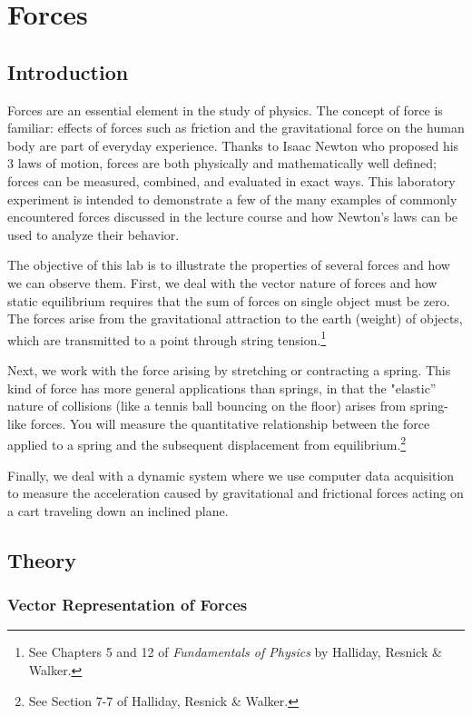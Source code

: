 \chapter{Forces}
\label{chap:forces}
\section{Introduction}

Forces are an essential element in the study of physics. The concept of force is familiar: effects of forces such as friction and the gravitational force on the human body are part of everyday experience. Thanks to Isaac Newton who proposed his 3 laws of motion, forces are both physically and mathematically well defined; forces can be measured, combined, and evaluated in exact ways. This laboratory experiment  is intended to demonstrate a few of the many examples of commonly encountered forces discussed in the lecture course and how Newton's laws can be used to analyze their behavior. \myskip

The objective of this lab is to  illustrate the properties of several forces and how we can observe them. First, we deal with the vector nature of forces and how static equilibrium requires that the sum of forces on single object must be zero. The forces arise from the gravitational attraction to the earth (weight) of objects, which are transmitted to a point through string tension.\footnote{See Chapters 5 and 12 of \emph{Fundamentals of Physics} by Halliday, Resnick \& Walker.} \myskip

Next, we work with the force arising by stretching or contracting a spring. This kind of force has more general applications than springs, in that the "elastic'' nature of collisions (like a tennis ball bouncing on the floor) arises from spring-like forces. You will measure the quantitative relationship between the force applied to a spring and the subsequent displacement from equilibrium.\footnote{See Section 7-7 of Halliday, Resnick \& Walker.} \myskip

Finally, we deal with a dynamic system where we use computer data acquisition to measure the acceleration caused by gravitational and frictional forces acting on a cart traveling down an inclined plane. \myskip

\section{Theory}

\subsection{Vector Representation of Forces}

